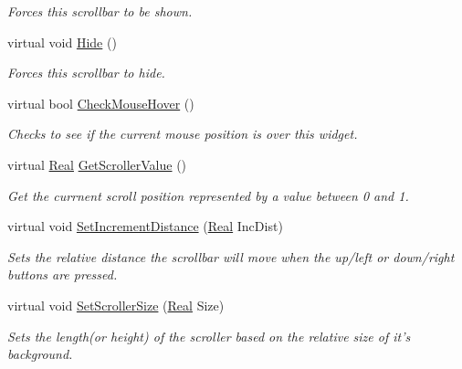 \begin{DoxyCompactItemize}
\begin{DoxyCompactList}\small\item\em Forces this scrollbar to be shown. \item\end{DoxyCompactList}\item 
\hypertarget{classphys_1_1UI_1_1Scrollbar_aa0aa0d3441ec9c8162025a7e06ec773b}{
virtual void \hyperlink{classphys_1_1UI_1_1Scrollbar_aa0aa0d3441ec9c8162025a7e06ec773b}{Hide} ()}
\label{d0/d3e/classphys_1_1UI_1_1Scrollbar_aa0aa0d3441ec9c8162025a7e06ec773b}

\begin{DoxyCompactList}\small\item\em Forces this scrollbar to hide. \item\end{DoxyCompactList}\item 
virtual bool \hyperlink{classphys_1_1UI_1_1Scrollbar_a8afdd63e36a7fdc15bd8660d9800f2c5}{CheckMouseHover} ()
\begin{DoxyCompactList}\small\item\em Checks to see if the current mouse position is over this widget. \item\end{DoxyCompactList}\item 
virtual \hyperlink{namespacephys_af7eb897198d265b8e868f45240230d5f}{Real} \hyperlink{classphys_1_1UI_1_1Scrollbar_abd70ba640ef9475a77334aa209121812}{GetScrollerValue} ()
\begin{DoxyCompactList}\small\item\em Get the currnent scroll position represented by a value between 0 and 1. \item\end{DoxyCompactList}\item 
virtual void \hyperlink{classphys_1_1UI_1_1Scrollbar_aad3de181a665a2296ae4f6dc1186470d}{SetIncrementDistance} (\hyperlink{namespacephys_af7eb897198d265b8e868f45240230d5f}{Real} IncDist)
\begin{DoxyCompactList}\small\item\em Sets the relative distance the scrollbar will move when the up/left or down/right buttons are pressed. \item\end{DoxyCompactList}\item 
virtual void \hyperlink{classphys_1_1UI_1_1Scrollbar_af5f791a4633e1d090dded18918789a00}{SetScrollerSize} (\hyperlink{namespacephys_af7eb897198d265b8e868f45240230d5f}{Real} Size)
\begin{DoxyCompactList}\small\item\em Sets the length(or height) of the scroller based on the relative size of it's background. \item\end{DoxyCompactList}\item 

\end{DoxyCompactItemize}
